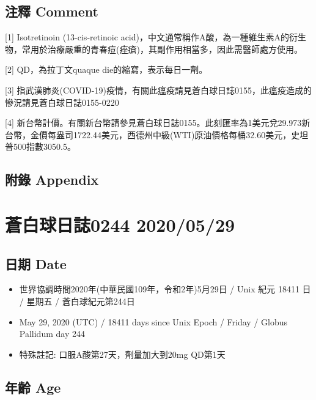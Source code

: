 \documentclass[a5paper, 12pt
]{book}
\providecommand{\tightlist}{%
  \setlength{\itemsep}{0pt}\setlength{\parskip}{0pt}}
\begin{document}
\hypertarget{ux6ce8ux91cb-comment-88}{%
\subsection{注釋 Comment}\label{ux6ce8ux91cb-comment-88}}

{[}1{]} Isotretinoin (13-cis-retinoic
acid)，中文通常稱作A酸，為一種維生素A的衍生物，常用於治療嚴重的青春痘(痤瘡)，其副作用相當多，因此需醫師處方使用。

{[}2{]} QD，為拉丁文quaque die的縮寫，表示每日一劑。

{[}3{]}
指武漢肺炎(COVID-19)疫情，有關此瘟疫請見蒼白球日誌0155，此瘟疫造成的慘況請見蒼白球日誌0155-0220

{[}4{]}
新台幣計價。有關新台幣請參見蒼白球日誌0155。此刻匯率為1美元兌29.973新台幣，金價每盎司1722.44美元，西德州中級(WTI)原油價格每桶32.60美元，史坦普500指數3050.5。

\hypertarget{ux9644ux9304-appendix-88}{%
\subsection{附錄 Appendix}\label{ux9644ux9304-appendix-88}}

\hypertarget{ux84bcux767dux7403ux65e5ux8a8c0244-20200529}{%
\section{蒼白球日誌0244
2020/05/29}\label{ux84bcux767dux7403ux65e5ux8a8c0244-20200529}}

\hypertarget{ux65e5ux671f-date-89}{%
\subsection{日期 Date}\label{ux65e5ux671f-date-89}}

\begin{itemize}
\tightlist
\item
  世界協調時間2020年(中華民國109年，令和2年)5月29日 / Unix 紀元 18411 日
  / 星期五 / 蒼白球紀元第244日
\item
  May 29, 2020 (UTC) / 18411 days since Unix Epoch / Friday / Globus
  Pallidum day 244
\item
  特殊註記: 口服A酸第27天，劑量加大到20mg QD第1天
\end{itemize}

\hypertarget{ux5e74ux9f61-age-89}{%
\subsection{年齡 Age}\label{ux5e74ux9f61-age-89}}
\end{document}

